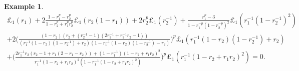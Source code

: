 \documentclass{amsart}
\theoremstyle{definition}
\newtheorem{example}[theorem]{Example}
\numberwithin{equation}{subsection}
\begin{document}
\begin{example}
\[
\begin{aligned}
\pounds_1(r_1)+ 2\frac{1-r_1^p-r_2^p}{1-r_2^p+r_1^pr_2^p} \pounds_1 (r_2(1-r_1))+2r_2^p \pounds _{1}(r_{2}^{-1})+ \frac{r_1 ^p-3}{1-r_1^{-p}(1-r_2^{-p})^2}\pounds_1 (r_1^{-1} (1 - r_2 ^{-1})^2)\\
+2\Big(\frac{(1-r_2)(r_2+(r_2^{-1}-1)(2r_1^{-1}+r_{1}^{-1}r_{2}-1 ) )}{(r_1 ^{-1}(1-r_2)(1-r_2^{-1})+r_2)(1-r_1 ^{-1}(1-r_2)(1-r_2^{-1})-r_2)}\Big)^p\pounds_1 (r_1 ^{-1}(1-r_2)(1-r_2^{-1})+r_2)\\
+\Big(\frac{2r_1^{-1}r_{2}(r_2-1+r_{1}(2-r_1-r_2))+(1-r_1^{-1})(1-r_2+r_1r_2)^2}{r_1^{-1}(1-r_2+r_1r_2)^2(1-r_1^{-1}(1-r_2+r_1r_2)^2)} \Big)^p \pounds_1 (r_1^{-1}(1 - r_2 + r_1 r_2)^2)=0.\\
\end{aligned}
\]
\end{example}

\end{document}
